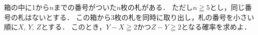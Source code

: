 \documentclass[../../main.tex]{subfiles}
\begin{document}
箱の中に1から$n$までの番号がついた$n$枚の札がある．
ただし$n\geqq5$とし，同じ番号の札はないとする．
この箱から3枚の札を同時に取り出し，札の番号を小さい順に$X, \, Y, \, Z$とする．
このとき，$Y-X\geqq2$かつ$Z-Y\geqq2$となる確率を求めよ．
\end{document}
